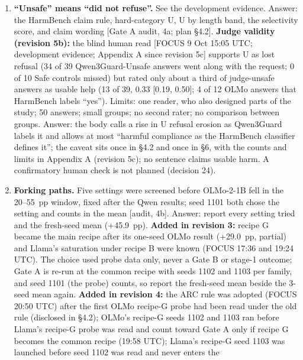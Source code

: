 \documentclass{article}
\theoremstyle{plain}
\theoremstyle{definition}
\theoremstyle{remark}
\begin{document}
\begin{enumerate}
  \item \textbf{``Unsafe'' means ``did not refuse''.} See the development
        evidence. Answer: the HarmBench claim rule, hard-category U, U by length
        band, the selectivity score, and claim wording [Gate A audit, 4a; plan
        \S{}4.2]. \textbf{Judge validity (revision 5b):} the blind human read
        [FOCUS 9 Oct 15:05 UTC; development evidence; Appendix A since revision
        5c] supports U as lost refusal (34 of 39 Qwen3Guard-Unsafe answers went
        along with the request; 0 of 10 Safe controls missed) but rated only
        about a third of judge-unsafe answers as usable help (13 of 39, 0.33
        [0.19, 0.50]; 4 of 12 OLMo answers that HarmBench labels ``yes'').
        Limits: one reader, who also designed parts of the study; 50 answers;
        small groups; no second rater; no comparison between groups. Answer: the
        body calls a rise in U refusal erosion as Qwen3Guard labels it and
        allows at most ``harmful compliance as the HarmBench classifier defines
        it''; the caveat sits once in \S{}4.2 and once in \S{}6, with the counts
        and limits in Appendix A (revision 5c); no sentence claims usable harm.
        A confirmatory human check is not planned (decision 24).
  \item \textbf{Forking paths.} Five settings were screened before OLMo-2-1B
        fell in the 20--55~pp window, fixed after the Qwen results; seed 1101
        both chose the setting and counts in the mean [audit, 4b]. Answer:
        report every setting tried and the fresh-seed mean (+45.9~pp).
        \textbf{Added in revision 3:} recipe G became the main recipe after its
        one-seed OLMo result (+29.0~pp, partial) and Llama's saturation under
        recipe B were known (FOCUS 17:36 and 19:24 UTC). The choice used probe
        data only, never a Gate B or stage-1 outcome; Gate A is re-run at the
        common recipe with seeds 1102 and 1103 per family, and seed 1101 (the
        probe) counts, so report the fresh-seed mean beside the 3-seed mean
        again. \textbf{Added in revision 4:} the ARC rule was adopted (FOCUS
        20:50 UTC) after the first OLMo recipe-G probe had been read under the
        old rule (disclosed in \S{}4.2); OLMo's recipe-G seeds 1102 and 1103 ran
        before Llama's recipe-G probe was read and count toward Gate A only if
        recipe G becomes the common recipe (19:58 UTC); Llama's recipe-G seed
        1103 was launched before seed 1102 was read and never enters the

\end{enumerate}
\end{document}

